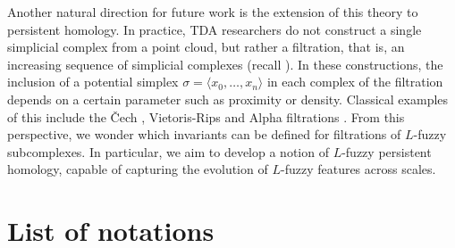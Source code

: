 \documentclass[a4paper,10pt]{article}
\begin{document}
Another natural direction for future work is the extension of this theory to persistent homology. In practice, TDA researchers do not construct a single simplicial complex from a point cloud, 
but rather a filtration, that is, an increasing sequence of simplicial complexes (recall ). In these constructions, the inclusion of a potential simplex \(\sigma=\langle x_0, \dots, x_n \rangle\) in each complex of the filtration depends on a certain parameter such as proximity or density. Classical examples of this include the \v{C}ech \cite{carlsson2009topology}, Vietoris-Rips \cite{zomorodian2010fast} and Alpha filtrations \cite{giesen2006conformal}. From this perspective, we wonder which invariants can be defined for filtrations of \(L\)-fuzzy subcomplexes. In particular, we aim to develop a notion of \(L\)-fuzzy persistent homology, capable of capturing the evolution of \(L\)-fuzzy features across scales.

\appendix

\section{List of notations}
\label{sec:listofnotations}
\end{document}
